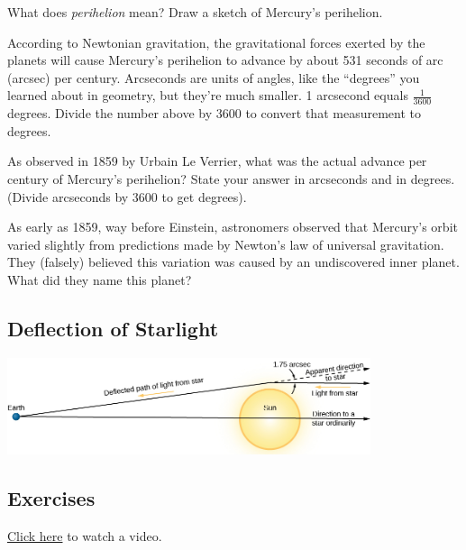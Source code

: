 \documentclass{article}
\numberwithin{equation}{section}
\numberwithin{figure}{section}
\begin{document}
\begin{exercise}
    What does \textit{perihelion} mean? Draw a sketch of Mercury's perihelion.
\end{exercise}

\begin{exercise}
    According to Newtonian gravitation, the gravitational forces exerted by the planets will cause Mercury's perihelion to advance by about 531 seconds of arc (arcsec) per century. Arcseconds are units of angles, like the ``degrees'' you learned about in geometry, but they're much smaller. 1 arcsecond equals $\frac{1}{3600}$ degrees. Divide the number above by 3600 to convert that measurement to degrees.
\end{exercise}

\begin{exercise}
    As observed in 1859 by Urbain Le Verrier, what was the actual advance per century of Mercury's perihelion? State your answer in arcseconds and in degrees. (Divide arcseconds by 3600 to get degrees).
\end{exercise}

\begin{exercise}
    As early as 1859, way before Einstein, astronomers observed that Mercury's orbit varied slightly from predictions made by Newton's law of universal gravitation. They (falsely) believed this variation was caused by an undiscovered inner planet. What did they name this planet?
\end{exercise}

\clearpage
\subsection*{Deflection of Starlight}

\begin{center}
    \includegraphics[width=0.8\textwidth]{Figures/Figure24.10.jpg}
\end{center}

\subsection*{Exercises}

\href{https://youtu.be/HLxvq_M4218}{Click here} to watch a video. 
\end{document}
